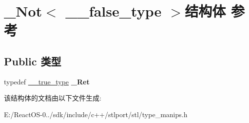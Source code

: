 \hypertarget{struct___not_3_01____false__type_01_4}{}\section{\+\_\+\+Not$<$ \+\_\+\+\_\+false\+\_\+type $>$结构体 参考}
\label{struct___not_3_01____false__type_01_4}
\subsection*{Public 类型}
\begin{DoxyCompactItemize}
\item 
\mbox{\label{struct___not_3_01____false__type_01_4_abb5001d89fce38683f5a30bf861c1dcd}} 
typedef \hyperlink{struct____true__type}{\+\_\+\+\_\+true\+\_\+type} {\bfseries \+\_\+\+Ret}
\end{DoxyCompactItemize}


该结构体的文档由以下文件生成\+:\begin{DoxyCompactItemize}
\item 
E\+:/\+React\+O\+S-\/0../sdk/include/c++/stlport/stl/type\+\_\+manips.\+h\end{DoxyCompactItemize}
